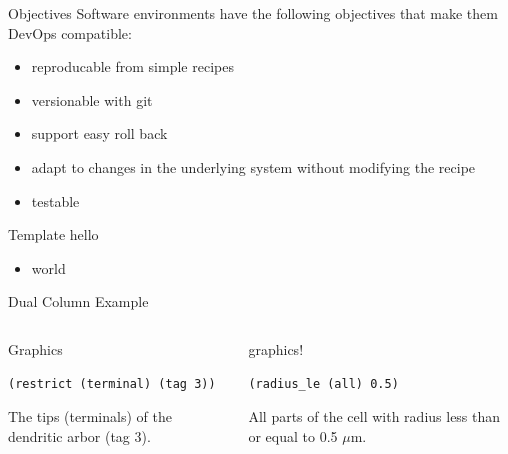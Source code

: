 \documentclass[aspectratio=43]{beamer}
\begin{document}
\begin{frame}[fragile]{Objectives}
    Software environments have the following objectives that make them DevOps compatible:
    \begin{itemize}
        \item reproducable from simple recipes
        \item versionable with git
        \item support easy roll back
        \item adapt to changes in the underlying system without modifying the recipe
        \item testable
    \end{itemize}
\end{frame}





\begin{frame}[fragile]{Template}
    hello
    \begin{itemize}
        \item world
    \end{itemize}
\end{frame}

\begin{frame}[fragile]{Dual Column Example}
    \begin{columns}[T]
        \begin{column}{0.5\textwidth}
            Graphics

            \vspace{10pt}

            \begin{lstlisting}[style=arblang]
(restrict (terminal) (tag 3))
            \end{lstlisting}

            The tips (terminals) of the dendritic arbor (tag 3).

        \end{column}
        \begin{column}{0.5\textwidth}
            graphics!

            \vspace{10pt}

            \begin{lstlisting}[style=arblang]
(radius_le (all) 0.5)
            \end{lstlisting}
            All parts of the cell with radius less than or equal to 0.5 $\mu$m.

        \end{column}
    \end{columns}
\end{frame}
\end{document}
